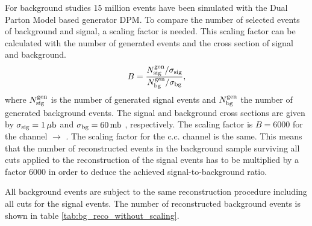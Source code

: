 For background studies 15 million events have been simulated with the Dual Parton Model based generator DPM.
To compare the number of selected events of background and signal, a scaling factor is needed.
This scaling factor can be calculated with the number of generated events and the cross section of signal and background.
\begin{equation}
		B = \frac{N^{\textnormal{gen}}_{\textnormal{sig}}/\sigma_{\textnormal{sig}}}{N^{\textnormal{gen}}_{\textnormal{bg}}/\sigma_{\textnormal{bg}}},
\label{eq:bg_scaling}
\end{equation}
where $N^{\textnormal{gen}}_{\textnormal{sig}}$ is the number of generated signal events and $N^{\textnormal{gen}}_{\textnormal{bg}}$ the number of generated background events.
The signal and background cross sections are given by $\sigma_{\textnormal{sig}} = 1\,\mu\textnormal{b}$\cite{PANDAphysics2009} and $\sigma_{\textnormal{bg}} = 60\, \textnormal{mb}$ \cite{PDG}, respectively.
The scaling factor is $B=6000$ for the channel \pbarp $\rightarrow$ \excitedcascade \anticascade.
The scaling factor for the c.c. channel is the same. 
This means that the number of reconstructed events in the background sample surviving all cuts applied to the reconstruction of the signal events 
has to be multiplied by a factor 6000 in order to deduce the achieved signal-to-background ratio. 

%		 

All background events are subject to the same reconstruction procedure including all cuts for the signal events. 
The number of reconstructed background events is shown in table \ref{tab:bg_reco_without_scaling}.

